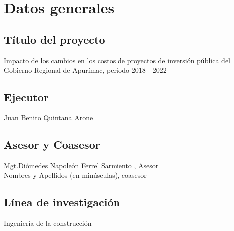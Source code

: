 \newpage
\chapter*{Datos generales}

\section*{Título del proyecto}
Impacto de los cambios en los costos de proyectos de inversión pública del Gobierno Regional de Apurímac, periodo 2018 - 2022
\section*{Ejecutor} 
\noindent Juan Benito Quintana Arone

\section*{Asesor y Coasesor}
\noindent Mgt.Diómedes Napoleón Ferrel Sarmiento , Asesor\\
Nombres y Apellidos (en minúsculas), coasesor

\section*{Línea de investigación}
\noindent Ingeniería de la construcción

\newpage

